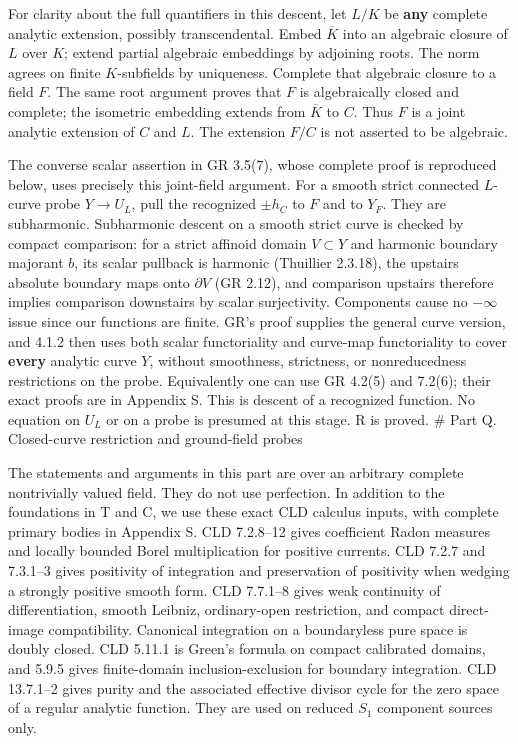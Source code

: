 \documentclass[
  10pt,
]{article}
\begin{document}
For clarity about the full quantifiers in this descent, let \(L/K\) be
\textbf{any} complete analytic extension, possibly transcendental. Embed
\(\overline K\) into an algebraic closure of \(L\) over \(K\); extend
partial algebraic embeddings by adjoining roots. The norm agrees on
finite \(K\)-subfields by uniqueness. Complete that algebraic closure to
a field \(F\). The same root argument proves that \(F\) is algebraically
closed and complete; the isometric embedding extends from
\(\overline K\) to \(C\). Thus \(F\) is a joint analytic extension of
\(C\) and \(L\). The extension \(F/C\) is not asserted to be algebraic.

The converse scalar assertion in GR 3.5(7), whose complete proof is
reproduced below, uses precisely this joint-field argument. For a smooth
strict connected \(L\)-curve probe \(Y\to U_L\), pull the recognized
\(\pm h_C\) to \(F\) and to \(Y_F\). They are subharmonic. Subharmonic
descent on a smooth strict curve is checked by compact comparison: for a
strict affinoid domain \(V\subset Y\) and harmonic boundary majorant
\(b\), its scalar pullback is harmonic (Thuillier 2.3.18), the upstairs
absolute boundary maps onto \(\partial V\) (GR 2.12), and comparison
upstairs therefore implies comparison downstairs by scalar surjectivity.
Components cause no \(-\infty\) issue since our functions are finite.
GR's proof supplies the general curve version, and 4.1.2 then uses both
scalar functoriality and curve-map functoriality to cover \textbf{every}
analytic curve \(Y\), without smoothness, strictness, or nonreducedness
restrictions on the probe. Equivalently one can use GR 4.2(5) and
7.2(6); their exact proofs are in Appendix S. This is descent of a
recognized function. No equation on \(U_L\) or on a probe is presumed at
this stage. R is proved. \# Part Q. Closed-curve restriction and
ground-field probes

The statements and arguments in this part are over an arbitrary complete
nontrivially valued field. They do not use perfection. In addition to
the foundations in T and C, we use these exact CLD calculus inputs, with
complete primary bodies in Appendix S. CLD 7.2.8--12 gives coefficient
Radon measures and locally bounded Borel multiplication for positive
currents. CLD 7.2.7 and 7.3.1--3 gives positivity of integration and
preservation of positivity when wedging a strongly positive smooth form.
CLD 7.7.1--8 gives weak continuity of differentiation, smooth Leibniz,
ordinary-open restriction, and compact direct-image compatibility.
Canonical integration on a boundaryless pure space is doubly closed. CLD
5.11.1 is Green's formula on compact calibrated domains, and 5.9.5 gives
finite-domain inclusion-exclusion for boundary integration. CLD
13.7.1--2 gives purity and the associated effective divisor cycle for
the zero space of a regular analytic function. They are used on reduced
\(S_1\) component sources only.
\end{document}
